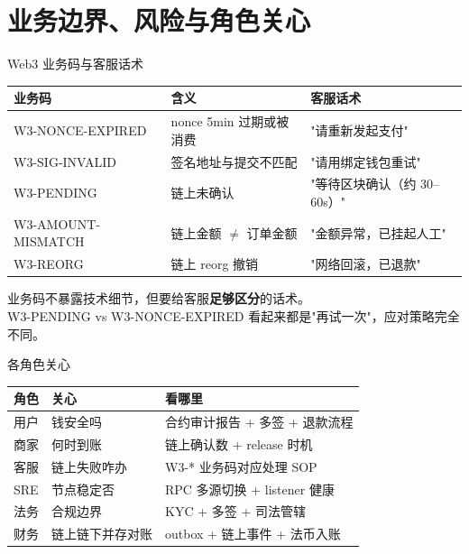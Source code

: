 \section{业务边界、风险与角色关心}

\begin{frame}{Web3 业务码与客服话术}
\begin{tabular}{@{}lll@{}}
\toprule
业务码              & 含义                  & 客服话术 \\
\midrule
W3-NONCE-EXPIRED    & nonce 5min 过期或被消费 & "请重新发起支付" \\
W3-SIG-INVALID      & 签名地址与提交不匹配   & "请用绑定钱包重试" \\
W3-PENDING          & 链上未确认             & "等待区块确认（约 30--60s）" \\
W3-AMOUNT-MISMATCH  & 链上金额 $\ne$ 订单金额 & "金额异常，已挂起人工" \\
W3-REORG            & 链上 reorg 撤销         & "网络回滚，已退款" \\
\bottomrule
\end{tabular}
\vspace{2mm}
\small 业务码不暴露技术细节，但要给客服\textbf{足够区分}的话术。\\
W3-PENDING vs W3-NONCE-EXPIRED 看起来都是"再试一次"，应对策略完全不同。
\end{frame}

\begin{frame}{各角色关心}
\begin{tabular}{@{}lll@{}}
\toprule
角色   & 关心               & 看哪里 \\
\midrule
用户   & 钱安全吗            & 合约审计报告 + 多签 + 退款流程 \\
商家   & 何时到账            & 链上确认数 + release 时机 \\
客服   & 链上失败咋办        & W3-* 业务码对应处理 SOP \\
SRE    & 节点稳定否          & RPC 多源切换 + listener 健康 \\
法务   & 合规边界            & KYC + 多签 + 司法管辖 \\
财务   & 链上链下并存对账     & outbox + 链上事件 + 法币入账 \\
\bottomrule
\end{tabular}
\vspace{2mm}
\end{frame}

